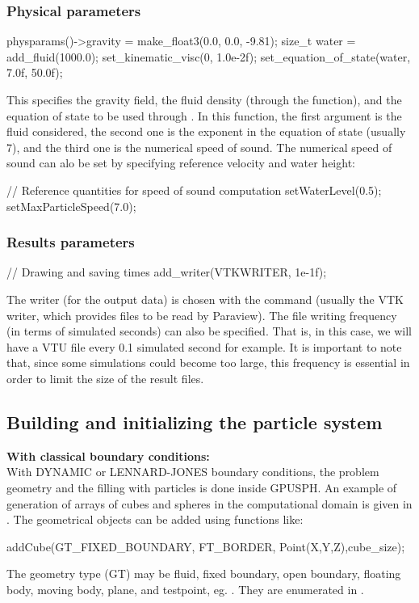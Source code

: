 \documentclass{../GPUSPHtemplate}
\begin{document}
\subsubsection{Physical parameters}
\begin{ccode}
physparams()->gravity = make_float3(0.0, 0.0, -9.81);
size_t water = add_fluid(1000.0);
set_kinematic_visc(0, 1.0e-2f);
set_equation_of_state(water, 7.0f, 50.0f);
\end{ccode} 
This specifies the gravity field, the fluid density 
(through the  function),
and the equation of state to be used through .
In this function, the first argument is the fluid considered,
the second one is the exponent in the equation of state (usually 7),
and the third one is the numerical speed of sound.
The numerical speed of sound can alo be set by specifying reference
velocity and water height:
\begin{ccode}
// Reference quantities for speed of sound computation
setWaterLevel(0.5);
setMaxParticleSpeed(7.0);
\end{ccode} 
   
\subsubsection{Results parameters}
\begin{ccode}
  // Drawing and saving times
  add_writer(VTKWRITER, 1e-1f);
\end{ccode} 
The writer (for the output data) is chosen with the 
command (usually the VTK writer, which provides files to be read by Paraview).  
The file writing frequency (in terms of simulated seconds) can also be specified. 
That is, in this case, we will have a VTU file every 0.1 simulated second for example. 
It is important to note that, since some simulations could become 
too large, this frequency is essential in order to limit the size of the result files.\\


\subsection{Building and initializing the particle system}

\textbf{With classical boundary conditions:}\\

With DYNAMIC or LENNARD-JONES boundary conditions, the
problem geometry and the filling with particles is done
inside GPUSPH. An example of generation of arrays
of cubes and spheres in the computational domain is given in
. 
The geometrical objects can be added using functions like:
\begin{ccode}
addCube(GT_FIXED_BOUNDARY, FT_BORDER,
             Point(X,Y,Z),cube_size);
\end{ccode}
The geometry type (GT) may be fluid, fixed boundary, open boundary, 
floating body, moving body, plane, and testpoint, eg. . 
They are enumerated in .\\
\end{document}
